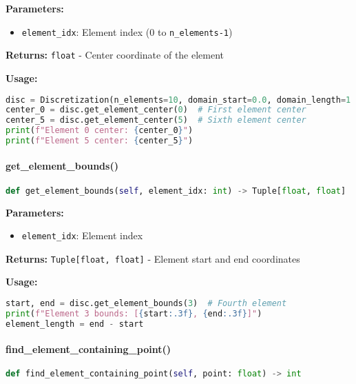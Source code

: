 \textbf{Parameters:}
\begin{itemize}
    \item \texttt{element\_idx}: Element index (0 to \texttt{n\_elements-1})
\end{itemize}

\textbf{Returns:} \texttt{float} - Center coordinate of the element

\textbf{Usage:}
\begin{lstlisting}[language=Python, caption=Element Center Usage]
disc = Discretization(n_elements=10, domain_start=0.0, domain_length=1.0)
center_0 = disc.get_element_center(0)  # First element center
center_5 = disc.get_element_center(5)  # Sixth element center
print(f"Element 0 center: {center_0}")
print(f"Element 5 center: {center_5}")
\end{lstlisting}

\paragraph{get\_element\_bounds()}\leavevmode
\begin{lstlisting}[language=Python, caption=Get Element Bounds Method]
def get_element_bounds(self, element_idx: int) -> Tuple[float, float]
\end{lstlisting}

\textbf{Parameters:}
\begin{itemize}
    \item \texttt{element\_idx}: Element index
\end{itemize}

\textbf{Returns:} \texttt{Tuple[float, float]} - Element start and end coordinates

\textbf{Usage:}
\begin{lstlisting}[language=Python, caption=Element Bounds Usage]
start, end = disc.get_element_bounds(3)  # Fourth element
print(f"Element 3 bounds: [{start:.3f}, {end:.3f}]")
element_length = end - start
\end{lstlisting}

\paragraph{find\_element\_containing\_point()}
\begin{lstlisting}[language=Python, caption=Find Element Method]
def find_element_containing_point(self, point: float) -> int
\end{lstlisting}

